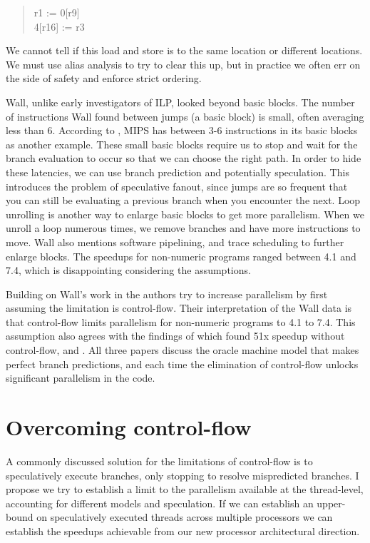 \documentclass[12pt,twoside,letterpaper]{article}
\begin{document}
\begin{quote}
r1 := 0[r9] \\
4[r16] := r3
\end{quote}

We cannot tell if this load and store is to the same location or different locations. We must use alias analysis to try to clear this up, but in practice we often err on the side of safety and enforce strict ordering.

Wall, unlike early investigators of ILP, looked beyond basic blocks. The number of instructions Wall found between jumps (a basic block) is small, often averaging less than 6. According to \cite{Hennessy:2003p277}, MIPS has between 3-6 instructions in its basic blocks as another example. These small basic blocks require us to stop and wait for the branch evaluation to occur so that we can choose the right path. In order to hide these latencies, we can use branch prediction and potentially speculation. This introduces the problem of speculative fanout, since jumps are so frequent that you can still be evaluating a previous branch when you encounter the next. Loop unrolling is another way to enlarge basic blocks to get more parallelism. When we unroll a loop numerous times, we remove branches and have more instructions to move. Wall also mentions software pipelining, and trace scheduling to further enlarge blocks. The speedups for non-numeric programs ranged between 4.1 and 7.4, which is disappointing considering the assumptions.

Building on Wall's work in \cite{Lam:1992p188} the authors try to increase parallelism by first assuming the limitation is control-flow. Their interpretation of the Wall data is that control-flow limits parallelism for non-numeric programs to 4.1 to 7.4. This assumption also agrees with the findings of \cite{Riseman:1972p215} which found 51x speedup without control-flow, and \cite{Nicolau:1984p217}. All three papers discuss the oracle machine model that makes perfect branch predictions, and each time the elimination of control-flow unlocks significant parallelism in the code.

\section*{Overcoming control-flow}
A commonly discussed solution for the limitations of control-flow is to speculatively execute branches, only stopping to resolve mispredicted branches. I propose we try to establish a limit to the parallelism available at the thread-level, accounting for different models and speculation. If we can establish an upper-bound on speculatively executed threads across multiple processors we can establish the speedups achievable from our new processor architectural direction.
\end{document}
